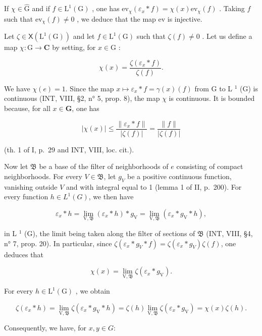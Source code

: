 If \(\chi \in \widehat{\mathrm{G}}\) and if \(f \in \mathrm{L}^1(\mathrm{G})\) , one has \(\mathrm{ev}_{\chi}(\varepsilon_x * f) = \chi(x)\mathrm{ev}_{\chi}(f)\) . Taking \(f\) such that \(\mathrm{ev}_{\chi}(f) \neq 0\) , we deduce that the map ev is injective.

Let \(\zeta\in\mathsf{X}(\mathrm{L}^{1}(\mathrm{G}))\) and let \(f\in\mathrm{L}^{1}(\mathrm{G})\) such that \(\zeta(f)\neq0\) . Let us define a map \(\chi\colon\mathrm{G}\to\mathbf{C}\) by setting, for \(x\in\mathrm{G}\) :

\[
\chi (x) = \frac {\zeta (\varepsilon_ {x} * f)}{\zeta (f)}.\tag{3}
\]

We have \(\chi(e) = 1\). Since the map \(x \mapsto \varepsilon_x * f = \gamma(x)(f)\) from G to L \(^1\) (G) is continuous (INT, VIII, §2, n° 5, prop. 8), the map \(\chi\) is continuous. It is bounded because, for all \(x \in \mathbf{G}\), one has

\[
| \chi (x) | \leqslant \frac {\| \varepsilon_ {x} * f \|}{| \zeta (f) |} = \frac {\| f \|}{| \zeta (f) |}
\]

(th. 1 of I, p.~29 and INT, VIII, loc. cit.).

Now let \(\mathfrak{B}\) be a base of the filter of neighborhoods of \(e\) consisting of compact neighborhoods. For every \(V \in \mathfrak{B}\), let \(g_V\) be a positive continuous function, vanishing outside \(V\) and with integral equal to 1 (lemma 1 of II, p.~200). For every function \(h \in L^1(G)\), we then have

\[
\varepsilon_ {x} * h = \lim _ {\mathrm{V}, \mathfrak {B}} (\varepsilon_ {x} * h) * g _ {\mathrm{V}} = \lim _ {\mathrm{V}, \mathfrak {B}} (\varepsilon_ {x} * g _ {\mathrm{V}} * h),
\]

in L \(^{1}\) (G), the limit being taken along the filter of sections of \(\mathfrak{B}\) (INT, VIII, §4, n° 7, prop. 20). In particular, since \(\zeta(\varepsilon_x * g_V * f) = \zeta(\varepsilon_x * g_V)\zeta(f)\), one deduces that

\[
\chi (x) = \lim _ {\mathrm{V}, \mathfrak {B}} \zeta (\varepsilon_ {x} * g _ {\mathrm{V}}).
\]

For every \(h\in \mathrm{L}^1 (\mathrm{G})\) , we obtain

\[
\zeta (\varepsilon_ {x} * h) = \lim _ {\mathrm{V}, \mathfrak {B}} \zeta (\varepsilon_ {x} * g _ {\mathrm{V}} * h) = \zeta (h) \lim _ {\mathrm{V}, \mathfrak {B}} \zeta (\varepsilon_ {x} * g _ {\mathrm{V}}) = \chi (x) \zeta (h).
\]

Consequently, we have, for \(x, y \in G\):

